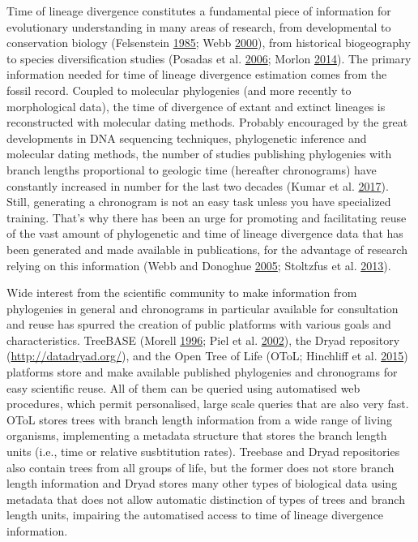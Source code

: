 \documentclass[]{article}
\begin{document}
Time of lineage divergence constitutes a fundamental piece of information for evolutionary
understanding in many areas of research, from developmental to conservation biology (Felsenstein \protect\hyperlink{ref-Felsenstein1985a}{1985}; Webb \protect\hyperlink{ref-Webb2000}{2000}), from historical biogeography to species diversification studies (Posadas et al. \protect\hyperlink{ref-posadas2006historical}{2006}; Morlon \protect\hyperlink{ref-Morlon2014}{2014}). The primary information needed for time of lineage divergence estimation comes from the fossil record. Coupled to molecular phylogenies (and more recently to morphological data), the time of divergence of extant and extinct lineages is reconstructed with molecular dating methods.
Probably encouraged by the great developments in DNA sequencing techniques, phylogenetic inference and molecular dating methods, the number of studies publishing phylogenies with branch lengths proportional to geologic time (hereafter chronograms) have constantly increased in number for the last two decades (Kumar et al. \protect\hyperlink{ref-Kumar2017}{2017}).
Still, generating a chronogram is not an easy task unless you have specialized training. That's why there has been an urge for promoting and facilitating reuse of the vast amount of phylogenetic and time of lineage divergence data that has been generated and made available in publications, for the advantage of research relying on this information (Webb and Donoghue \protect\hyperlink{ref-webb2005phylomatic}{2005}; Stoltzfus et al. \protect\hyperlink{ref-Stoltzfus2013}{2013}).

Wide interest from the scientific community to make information from phylogenies in general and chronograms in particular available for consultation and reuse has spurred the creation of public platforms with various goals and characteristics. TreeBASE (Morell \protect\hyperlink{ref-morell1996roots}{1996}; Piel et al. \protect\hyperlink{ref-Piel2002}{2002}), the Dryad repository (\url{http://datadryad.org/}), and the Open Tree of Life (OToL; Hinchliff et al. \protect\hyperlink{ref-Hinchliff2015}{2015}) platforms store and make available published phylogenies and chronograms for easy scientific reuse. All of them can be queried using automatised web procedures, which permit personalised, large scale queries that are also very fast.
OToL stores trees with branch length information from a wide range of living organisms, implementing a metadata structure that stores the branch length units (i.e., time or relative susbtitution rates). Treebase and Dryad repositories also contain trees from all groups of life, but the former does not store branch length information and Dryad stores many other types of biological data using metadata that does not allow automatic distinction of types of trees and branch length units, impairing the automatised access to time of lineage divergence information.
\end{document}
